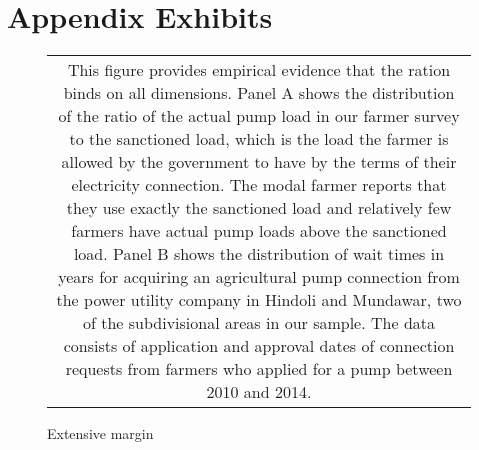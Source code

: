 \documentclass{article}
\numberwithin{table}{section}
\begin{document}
\renewcommand{\tabcolsep}{8pt}


\renewcommand{\tabcolsep}{8pt}
% 


\renewcommand{\tabcolsep}{8pt}


\renewcommand{\tabcolsep}{9pt}


\clearpage
\section{Appendix Exhibits}	
 
\begin{figure}[htbp]
	\centering
	\caption{Extensive margin\label{fig:sanctionedLoadBinds}}
	\subfiguretopcaptrue
	\begin{tabular*}{1.0\textwidth}{c}
		\multicolumn{1}{p{1.0\hsize}}{\footnotesize This figure provides empirical evidence that the ration binds on all dimensions. Panel A shows the distribution of the ratio of the actual pump load in our farmer survey to the sanctioned load, which is the load the farmer is allowed by the government to have by the terms of their electricity connection. The modal farmer reports that they use exactly the sanctioned load and relatively few farmers have actual pump loads above the sanctioned load. Panel B shows the distribution of wait times in years for acquiring an agricultural pump connection from the power utility company in Hindoli and Mundawar, two of the subdivisional areas in our sample. The data consists of application and approval dates of connection requests from farmers who applied for a pump between 2010 and 2014.}\\
	\end{tabular*}
\end{figure}

\clearpage

\renewcommand{\tabcolsep}{12pt}

\end{document}
